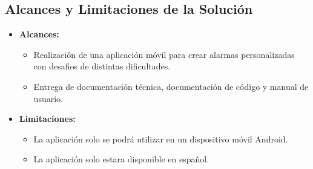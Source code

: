 \subsection{Alcances y Limitaciones de la Solución}
\begin{itemize}
    \item \textbf{Alcances:}
    \begin{itemize}
        \item Realización de una aplicación móvil para crear alarmas personalizadas con desafios de distintas dificultades.
        \item  Entrega de documentación técnica, documentación de código y manual de usuario.
    \end{itemize}
    \item \textbf{Limitaciones:}
     \begin{itemize}
        \item La aplicación solo se podrá utilizar en un dispositivo móvil Android.
        \item La aplicación solo estara disponible en español.
    \end{itemize}
    
\end{itemize}
